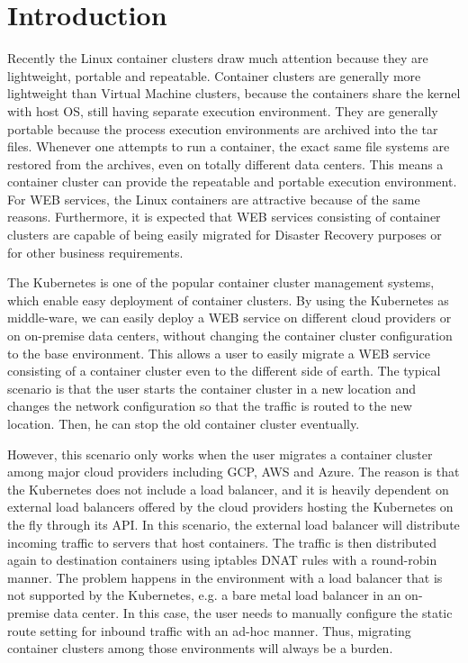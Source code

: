 \section{Introduction}

Recently the Linux container clusters draw much attention because they are lightweight, portable and repeatable.
Container clusters are generally more lightweight than Virtual Machine clusters, 
because the containers share the kernel with host OS, still having separate execution environment. 
They are generally portable because the process execution environments are archived into the tar files.
Whenever one attempts to run a container, the exact same file systems are restored from the archives, 
even on totally different data centers. 
This means a container cluster can provide the repeatable and portable execution environment.
For WEB services, the Linux containers are attractive because of the same reasons. 
Furthermore, it is expected that WEB services consisting of container clusters are 
capable of being easily migrated for Disaster Recovery purposes or for other business requirements.

The Kubernetes\cite{K8s2017} is one of the popular container cluster management systems, 
which enable easy deployment of container clusters.
By using the Kubernetes as middle-ware, we can easily deploy a WEB service on different 
cloud providers or on on-premise data centers, without changing the container cluster configuration to the base environment. 
This allows a user to easily migrate a WEB service consisting of a container cluster even to the different side of earth. 
The typical scenario is that the user starts the container cluster in a new location and changes the network configuration 
so that the traffic is routed to the new location. Then, he can stop the old container cluster eventually.

However, this scenario only works when the user migrates a container cluster among major cloud providers including GCP, AWS and Azure.
The reason is that the Kubernetes does not include a load balancer, 
and it is heavily dependent on external load balancers offered by the cloud providers hosting the Kubernetes on the fly through its API. 
In this scenario, the external load balancer will distribute incoming traffic to servers that host containers.
The traffic is then distributed again to destination containers using iptables DNAT\cite{MartinA.Brown2017,Marmol2015} 
rules with a round-robin manner. 
The problem happens in the environment with a load balancer that is not supported by the Kubernetes, 
e.g. a bare metal load balancer in an on-premise data center. In this case, the user needs to manually configure 
the static route setting for inbound traffic with an ad-hoc manner. 
Thus, migrating container clusters among those environments will always be a burden.

